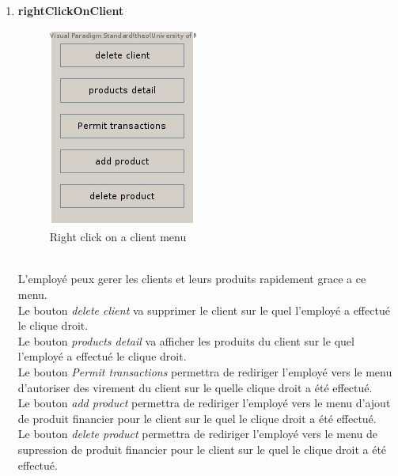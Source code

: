 \documentclass[../rapport.tex]{subfiles}
\begin{document}
\begin{enumerate}
\newpage
\item \textbf{rightClickOnClient} \\
		\begin{figure}[h!]
				\centering \includegraphics[scale=0.2]{ressources/photos_diagrammes/app2/gui/rightClickOnAClient.jpg}
				\caption{Right click on a client menu}
		\end{figure}
		\\
L'employé peux gerer les clients et leurs produits rapidement grace a ce menu.\\
Le bouton \textit{delete client} va supprimer le client sur le quel l'employé a effectué le clique droit.\\
Le bouton \textit{products detail} va afficher les produits du client sur le quel l'employé a effectué le clique droit.\\
Le bouton \textit{Permit transactions} permettra de rediriger l'employé vers le menu d'autoriser des virement du client sur le quelle clique droit a été effectué.\\
Le bouton \textit{add product} permettra de rediriger l'employé vers le menu d'ajout de produit financier pour le client sur le quel le clique droit a été effectué.\\
Le bouton \textit{delete product} permettra de rediriger l'employé vers le menu de supression de produit financier pour le client sur le quel le clique droit a été effectué.\\


\end{enumerate}
\end{document}
